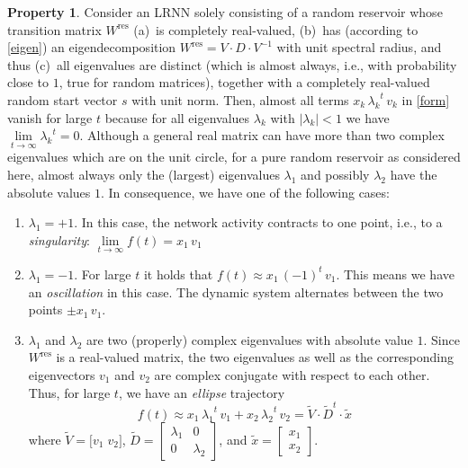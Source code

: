 \documentclass[preprint,12pt,times,authoryear]{elsarticle}%
\theoremstyle{definition}
\newtheorem{prop}{Property}
\begin{document}
\begin{prop}\label{infty}
Consider an LRNN solely consisting of a random reservoir whose transition matrix
$W^\mathrm{res}$ (a)~is completely real-valued, (b)~has (according to
\cref{eigen}) an eigendecomposition $W^\mathrm{res} = V \cdot D \cdot V^{-1}$
with unit spectral radius, and thus (c)~all eigenvalues are distinct (which is almost
always, i.e., with probability close to $1$, true for random matrices), together
with a completely real-valued random start vector $s$ with unit norm. Then,
almost all terms $x_k\,{\lambda_k}^t\,v_k$ in \cref{form} vanish for large $t$
because for all eigenvalues $\lambda_k$ with $|\lambda_k| < 1$ we have
$\lim\limits_{t \to \infty} {\lambda_k}^t = 0$. Although a general real matrix
can have more than two complex eigenvalues which are on the unit circle, for a
pure random reservoir as considered here, almost always only the (largest)
eigenvalues $\lambda_1$ and possibly $\lambda_2$ have the absolute values $1$.
In consequence, we have one of the following cases:
\begin{enumerate}
  \item $\lambda_1 = +1$. In this case, the network activity contracts to one
	point, i.e., to a \emph{singularity}: $\lim\limits_{t \to \infty}
	f(t) = x_1\,v_1$
  \item $\lambda_1 = -1$. For large $t$ it holds that $f(t) \approx
	x_1\,(-1)^t\,v_1$. This means we have an \emph{oscillation} in this
	case. The dynamic system alternates between the two points $\pm x_1\,v_1$.
  \item $\lambda_1$ and $\lambda_2$ are two (properly) complex eigenvalues with
	absolute value $1$. Since $W^\mathrm{res}$ is a real-valued matrix, the two
	eigenvalues as well as the corresponding eigenvectors $v_1$ and $v_2$
	are complex conjugate with respect to each other. Thus, for large $t$, we
	have an \emph{ellipse} trajectory
	\[
		f(t) \approx x_1\,{\lambda_1}^t\,v_1 + x_2\,{\lambda_2}^t\,v_2
		= \tilde{V} \cdot \tilde{D}^t \cdot \tilde{x}
	\]
	where $\tilde{V} = \big[ v_1\;v_2 \big]$, $\tilde{D} = \left[
	\begin{array}{cc} \lambda_1 & 0 \\ 0 & \lambda_2 \end{array} \right]$,
	and $\tilde{x} = \left[ \begin{array}{c} x_1 \\ x_2 \end{array}
	\right]$.
\end{enumerate}
\end{prop}
\end{document}
